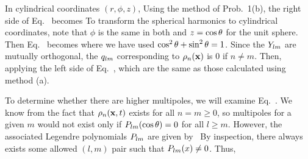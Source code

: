 {	In cylindrical coordinates $(r, \phi, z)$,
	Using the method of Prob.~{1(b)}, the right side of Eq.~ becomes
	To transform the spherical harmonics to cylindrical coordinates, note that $\phi$ is the same in both and $z = \cos\theta$ for the unit sphere.  Then Eq.~ becomes
	where we have used $\cos^2\theta + \sin^2\theta = 1$.  Since the $Y_{l m}$ are mutually orthogonal, the $q_{l m}$ corresponding to $\rho_n(\vb{x})$ is 0 if $n \neq m$.  Then, applying the left side of Eq.~,
	which are the same as those calculated using method (a).
	
	To determine whether there are higher multipoles, we will examine Eq.~.  We know from the fact that $\rho_n(\vb{x}, t)$ exists for all $n = m \geq 0$, so multipoles for a given $m$ would not exist only if $P_{l m}(\cos\theta) = 0$ for all $l \geq m$.  However, the associated Legendre polynomials $P_{l m}$ are given by~\cite{ALP}
	By inspection, there always exists some allowed $(l, m)$ pair such that $P_{l m}(x) \neq 0$.  Thus, 
}